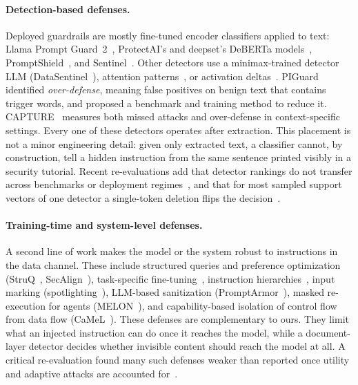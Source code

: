 \paragraph{Detection-based defenses.}
Deployed guardrails are mostly fine-tuned encoder classifiers applied to
text: Llama Prompt Guard~2~\cite{meta2025promptguard2,chennabasappa2025llamafirewall},
ProtectAI's and deepset's DeBERTa
models~\cite{protectai2024debertav2,deepset2023deberta},
PromptShield~\cite{jacob2025promptshield}, and
Sentinel~\cite{ivry2025sentinel}. Other detectors use a minimax-trained
detector LLM (DataSentinel~\cite{liu2025datasentinel}), attention
patterns~\cite{hung2025attention}, or activation deltas~\cite{abdelnabi2025get}.
PIGuard~\cite{li2025piguard} identified \emph{over-defense}, meaning false
positives on benign text that contains trigger words, and proposed a
benchmark and training method to reduce it. CAPTURE~\cite{kholkar2025capture}
measures both missed attacks and over-defense in context-specific settings.
Every one of these detectors operates after extraction. This placement is
not a minor engineering detail: given only extracted text, a classifier
cannot, by construction, tell a hidden instruction from the same sentence
printed visibly in a security tutorial. Recent re-evaluations add that
detector rankings do not transfer across benchmarks or deployment
regimes~\cite{liu2026passing,akinrele2026prompt}, and that for most
sampled support vectors of one detector a single-token deletion flips the
decision~\cite{kongmanee2026latent}.

\paragraph{Training-time and system-level defenses.}
A second line of work makes the model or the system robust to instructions
in the data channel. These include structured queries and preference
optimization (StruQ~\cite{chen2025struq}, SecAlign~\cite{chen2025secalign}),
task-specific fine-tuning~\cite{piet2024jatmo}, instruction
hierarchies~\cite{wallace2024instruction}, input marking
(spotlighting~\cite{hines2024defending}), LLM-based sanitization
(PromptArmor~\cite{shi2025promptarmor}), masked re-execution for agents
(MELON~\cite{zhu2025melon}), and capability-based isolation of control flow
from data flow (CaMeL~\cite{debenedetti2026defeating}). These defenses are
complementary to ours. They limit what an injected instruction can do once
it reaches the model, while a document-layer detector decides whether
invisible content should reach the model at all. A critical re-evaluation
found many such defenses weaker than reported once utility and adaptive
attacks are accounted for~\cite{jia2026critical}.

